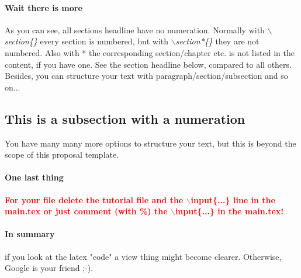 \paragraph{Wait there is more}
As you can see, all sections headline have no numeration. Normally with \textit{$\backslash$section\{\}} every section is numbered, but with \textit{$\backslash$section*\{\}} they are not numbered.
Also with * the corresponding section/chapter etc. is not listed in the content, if you have one.
See the section headline below, compared to all others.
Besides, you can structure your text with paragraph/section/subsection and so on...

\subsection{This is a subsection with a numeration}
You have many many more options to structure your text, but this is beyond the scope of this proposal template.\\

\paragraph{One last thing}
\textcolor{red}{\textbf{For your file delete the tutorial file and the $\backslash$input\{...\} line in the main.tex or just comment (with \%) the $\backslash$input\{...\} in the main.tex!}}

\paragraph{In summary} if you look at the latex "code" a view thing might become clearer. Otherwise, Google is your friend ;-). 